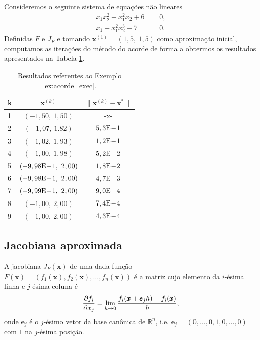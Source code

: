 \begin{ex}\label{ex:acorde_exec}
  Consideremos o seguinte sistema de equações não lineares
  \begin{align}
    x_1x_2^2 - x_1^2x_2 + 6 &= 0,\\
    x_1 + x_1^2x_2^3 - 7 &= 0.
  \end{align}
  Definidas $F$ e $J_F$ e tomando $\pmb{x}^{(1)} = (1,5,~1,5)$ como aproximação inicial, computamos as iterações do método do acorde de forma a obtermos os resultados apresentados na Tabela \ref{tab:ex_acorde_exec}.

  \begin{table}[h!]
    \centering
    \begin{tabular}{lcc}
      k & $\pmb{x}^{(k)}$ & $\|\pmb{x}^{(k)} - \pmb{x}^*\|$\\\hline
      1 & $(-1,50,~1,50)$ & -x- \\
      2 & $(-1,07,~1.82)$ & $5,3\mathrm{E}\!-\!1$ \\
      3 & $(-1,02,~1,93)$ & $1,2\mathrm{E}\!-\!1$ \\
      4 & $(-1,00,~1,98)$ & $5,2\mathrm{E}\!-\!2$ \\
      5 & $(-9,98\mathrm{E}\!-\!1,~2,00)$ & $1,8\mathrm{E}\!-\!2$ \\
      6 & $(-9,98\mathrm{E}\!-\!1,~2,00)$ & $4,7\mathrm{E}\!-\!3$ \\
      7 & $(-9,99\mathrm{E}\!-\!1,~2,00)$ & $9,0\mathrm{E}\!-\!4$ \\
      8 & $(-1,00,~2,00)$ & $7,4\mathrm{E}\!-\!4$ \\
      9 & $(-1,00,~2,00)$ & $4,3\mathrm{E}\!-\!4$ \\\hline
    \end{tabular}
    \caption{Resultados referentes ao Exemplo \ref{ex:acorde_exec}.}
    \label{tab:ex_acorde_exec}
  \end{table}

% 
\end{ex}

\subsection{Jacobiana aproximada}

A jacobiana $J_F(\pmb{x})$ de uma dada função $F(\pmb{x}) = (f_1(\pmb{x}), f_2(\pmb{x}), \dotsc, f_n(\pmb{x}))$ é a matriz cujo elemento da $i$-ésima linha e $j$-ésima coluna é
\begin{equation}
  \frac{\partial f_i}{\partial x_j} = \lim_{h\to 0} \frac{f_i(\pmb{x}+\pmb{e}_jh) - f_i(\pmb{x})}{h},
\end{equation}
onde $\pmb{e}_j$ é o $j$-ésimo vetor da base canônica de $\mathbb{R}^n$, i.e. $\pmb{e}_j = (0, \dotsc, 0, 1, 0, \dotsc, 0)$ com $1$ na $j$-ésima posição.

